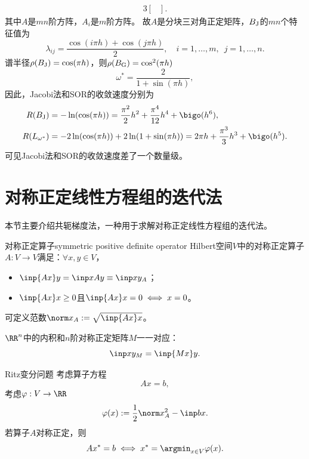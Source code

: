 \begin{example}
\begin{alignat*}{3}
\begin{bmatrix}
        \end{bmatrix}.
    \end{alignat*}
    其中$A$是$mn$阶方阵，$A_i$是$m$阶方阵。
    故$A$是分块三对角正定矩阵，$B_\text J$的$mn$个特征值为
    \[
        \lambda_{ij}=\frac{\cos(i\pi h)+\cos(j\pi h)}2,\quad i=1,\ldots,m,\enspace j=1,\ldots,n.
    \]
    谱半径$\rho(B_\text J)=\cos(\pi h)$，则$\rho(B_\text G)=\cos^2(\pi h)$
    \[
        \omega^*=\frac2{1+\sin(\pi h)},
    \]
    因此，Jacobi法和SOR的收敛速度分别为
    \begin{alignat*}{3}
        R(B_\text J)&=-\ln(\cos(\pi h))=\frac{\pi^2}2h^2+\frac{\pi^4}{12}h^4+\bigo(h^6),\\
        R(L_{\omega^*})&=-2\ln(\cos(\pi h))+2\ln(1+\sin(\pi h))=2\pi h+\frac{\pi^3}3h^3+\bigo(h^5).
    \end{alignat*}
    可见Jacobi法和SOR的收敛速度差了一个数量级。
\end{example}

\section{对称正定线性方程组的迭代法}

本节主要介绍共轭梯度法，一种用于求解对称正定线性方程组的迭代法。

\begin{definition}
    {对称正定算子}{symmetric positive definite operator}
    Hilbert空间$V$中的对称正定算子$A:V\to V$满足：$\forall x,y\in V$，
    \begin{itemize}
        \item $\inp{Ax}y=\inp x{Ay}\equiv\inp xy_A$；
        \item $\inp{Ax}x\geq 0$且$\inp{Ax}x=0\iff x=0$。
    \end{itemize}
    可定义范数$\norm x_A:=\sqrt{\inp{Ax}x}$。
\end{definition}

\begin{corollary}
    $\RR^n$中的内积和$n$阶对称正定矩阵$M$一一对应：
    \[
        \inp xy_M=\inp{Mx}y.
    \]
\end{corollary}

\begin{theorem}
    {Ritz变分问题}{}
    考虑算子方程
    \begin{equation}
        Ax=b,
    \end{equation}
    考虑$\varphi:V\to\RR$
    \begin{equation}
        \varphi(x):=\frac12\norm x_A^2-\inp bx.
    \end{equation}
    若算子$A$对称正定，则
    \begin{equation}
        Ax^*=b\iff x^*=\argmin_{x\in V}\varphi(x).
    \end{equation}
\end{theorem}

